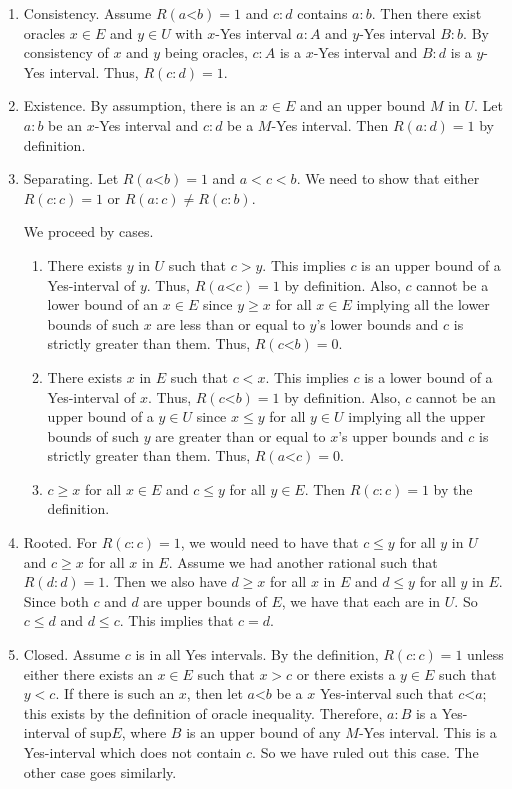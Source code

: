 \documentclass[12pt]{article}
\theoremstyle{remark}
\newcommand{\lt}{\mathord{<}}
\begin{document}
\begin{enumerate}
    \item Consistency. Assume $R(a \lt b)=1$ and $c:d$ contains $a:b$. Then there exist oracles $x \in E$ and $y \in U$ with $x$-Yes interval $a:A$ and $y$-Yes interval $B:b$. By consistency of $x$ and $y$ being oracles, $c:A$ is a $x$-Yes interval and $B:d$ is a $y$-Yes interval. Thus, $R(c:d) = 1$.
    \item Existence. By assumption, there is an $x \in E$ and an upper bound $M$ in $U$. Let $a:b$ be an $x$-Yes interval and $c:d$ be a $M$-Yes interval. Then $R(a:d) = 1$ by definition.  
    \item Separating. Let $R(a\lt b)=1$ and $a < c< b$. We need to show that either $R(c:c)=1$ or $R(a:c) \neq R(c:b)$. 

    We proceed by cases.
    \begin{enumerate}
    \item There exists $y$ in $U$ such that $c > y$. This implies $c$ is an upper bound of a Yes-interval of $y$. Thus, $R(a \lt c) = 1$ by definition. Also, $c$ cannot be a lower bound of an $x \in E$ since $y \geq x$ for all $x \in E$ implying all the lower bounds of such $x$ are less than or equal to $y$'s lower bounds and $c$ is strictly greater than them. Thus, $R(c \lt b) = 0$. 

    \item There exists $x$ in $E$ such that $c < x$.  This implies $c$ is a lower bound of a Yes-interval of $x$. Thus, $R(c \lt b) = 1$ by definition. Also, $c$ cannot be an upper bound of a $y \in U$ since $x \leq y$ for all $y \in U$ implying all the upper bounds of such $y$ are greater than or equal to $x$'s upper bounds and $c$ is strictly greater than them. Thus, $R(a \lt c) = 0$.

    \item $c \geq x$ for all $x \in E$ and $c \leq y$ for all $y \in E$. Then $R(c:c) = 1$ by the definition. 

     \end{enumerate}
    
    \item Rooted. For $R(c:c)=1$, we would need to have that $c \leq y$ for all $y$ in $U$ and $c \geq x$ for all $x$ in $E$. Assume we had another rational such that $R(d:d) = 1$. Then we also have $d \geq x$ for all $x$ in $E$ and $d \leq y$ for all $y$ in $E$. Since both $c$ and $d$ are upper bounds of $E$, we have that each are in $U$. So $c \leq d$ and $d \leq c$. This implies that $c = d$. 
    \item Closed. Assume $c$ is in all Yes intervals. By the definition, $R(c:c) = 1$ unless either there exists an $x \in E$ such that $x> c$ or there exists a $y \in E$ such that $y < c$. If there is such an $x$, then let $a\lt b$ be a $x$ Yes-interval such that $c \lt a$; this exists by the definition of oracle inequality. Therefore, $a:B$ is a Yes-interval of $\mathrm{sup} E$, where $B$ is an upper bound of any $M$-Yes interval. This is a Yes-interval which does not contain $c$. So we have ruled out this case. The other case goes similarly.
\end{enumerate}
\end{document}
